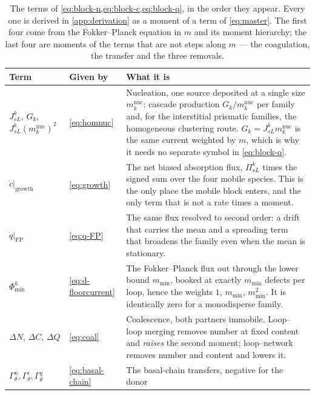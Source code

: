 \begin{table}[htbp]
\caption{The terms of \cref{eq:block-n,eq:block-c,eq:block-q}, in the order they
appear. Every one is derived in \cref{app:derivation} as a moment of a term of
\cref{eq:master}. The first four come from the Fokker--Planck equation in $m$
and its moment hierarchy; the last four are moments of the terms that are not
steps along $m$ --- the coagulation, the transfer and the three removals.}
\label{tab:block-terms}
\centering\small
\begin{tabularx}{\textwidth}{@{}>{\raggedright\arraybackslash}p{}
                              >{\raggedright\arraybackslash}p{}X@{}}
\toprule
Term & Given by & What it is \\
\midrule
$J^k_{sL}$, $G_k$, $J^k_{sL}(m^{\mathrm{nuc}}_k)^{2}$
  & \cref{eq:homnuc} & Nucleation, one source deposited at a single size
  $m^{\mathrm{nuc}}_k$: cascade production $G_k/m^{\mathrm{nuc}}_k$ per family
  and, for the interstitial prismatic families, the homogeneous clustering
  route. $G_k=J^k_{sL}m^{\mathrm{nuc}}_k$ is the same current weighted by $m$,
  which is why it needs no separate symbol in \cref{eq:block-q}. \\
\addlinespace
$\left.\dot c\right|_{\mathrm{growth}}$
  & \cref{eq:growth} & The net biased absorption flux, $\Pi^k_{sL}$ times the
  signed sum over the four mobile species. This is the only place the mobile
  block enters, and the only term that is not a rate times a moment. \\
\addlinespace
$\left.\dot q\right|_{\mathrm{FP}}$
  & \cref{eq:q-FP} & The same flux resolved to second order: a drift that
  carries the mean and a spreading term that broadens the family even when the
  mean is stationary. \\
\addlinespace
$\Phi^k_{\min}$
  & \cref{eq:d-floorcurrent} & The Fokker--Planck flux out through the lower
  bound $m_{\min}$, booked at exactly $m_{\min}$ defects per loop, hence the
  weights $1$, $m_{\min}$, $m_{\min}^{2}$. It is identically zero for a
  monodisperse family. \\
\addlinespace
$\Delta N$, $\Delta C$, $\Delta Q$
  & \cref{eq:coal} & Coalescence, both partners immobile. Loop--loop merging
  removes number at fixed content and \emph{raises} the second moment;
  loop--network removes number and content and lowers it. \\
\addlinespace
$\Gamma^{n}_{\theta},\Gamma^{c}_{\theta},\Gamma^{q}_{\theta}$
  & \cref{eq:basal-chain} & The basal-chain transfers, negative for the donor

\end{tabularx}
\end{table}
